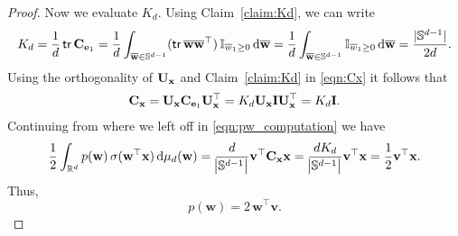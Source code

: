 \begin{proof}
	Now we evaluate $K_d$. Using Claim~\ref{claim:Kd}, we can write
	\begin{align*}
		K_d = \frac{1}{d} \operatorname{\mathsf{tr}} \mathbf{C}_{\mathbf{e}_1}
		= \frac{1}{d} \int_{\overline{\mathbf{w}} \in \mathbb{S}^{d-1}} (\operatorname{\mathsf{tr}} \overline{\mathbf{w}} \overline{\mathbf{w}}^{\top})\, \mathbb{I}_{\overline{w}_1 \ge 0}  \,\mathrm{d} \overline{\mathbf{w}} 
		= \frac{1}{d} \int_{\overline{\mathbf{w}} \in \mathbb{S}^{d-1}} \mathbb{I}_{\overline{w}_1 \ge 0}  \,\mathrm{d} \overline{\mathbf{w}} 
		= \frac{\abs[0]{\mathbb{S}^{d-1}}}{2d}. 
	\end{align*}
	Using the orthogonality of $\mathbf{U}_{\mathbf{x}}$ and Claim~\ref{claim:Kd} in \eqref{eqn:Cx} it follows that 
	\begin{align*}
		\mathbf{C}_{\mathbf{x}} = \mathbf{U}_{\mathbf{x}} \mathbf{C}_{\mathbf{e}_1} \mathbf{U}_{\mathbf{x}}^\top = K_d \mathbf{U}_{\mathbf{x}} \mathbf{I} \mathbf{U}_{\mathbf{x}}^\top = K_d \mathbf{I}. 
	\end{align*}
	Continuing from where we left off in \eqref{eqn:pw_computation} we have
	\begin{align*}
		\frac{1}{2} \int_{\mathbb{R}^d} p(\mathbf{w}) \,\sigma(\mathbf{w}^{\top} \mathbf{x} ) \,\mathrm{d} \mu_d (\mathbf{w}) 
		= \frac{d}{\abs{\mathbb{S}^{d-1}}}  \mathbf{v}^{\top} \mathbf{C}_{\mathbf{x}} \mathbf{x} 
		=  \frac{d K_d}{\abs{\mathbb{S}^{d-1}}} \mathbf{v}^{\top} \mathbf{x} 
		= \frac{1}{2} \mathbf{v}^{\top} \mathbf{x}.
	\end{align*}
	Thus, 
	\begin{equation*}
		p\left(\mathbf{w}\right) = 2 \,\mathbf{w}^{\top} \mathbf{v}. 
	\end{equation*}
\end{proof}
